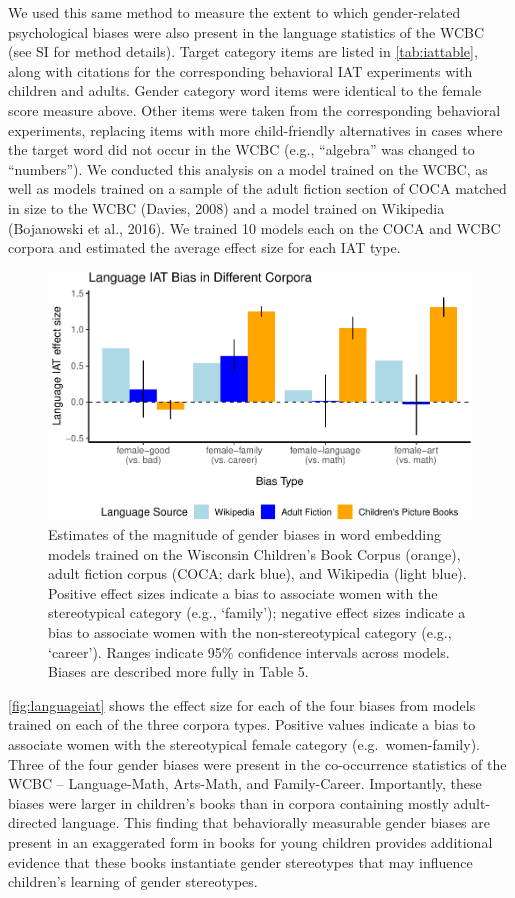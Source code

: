 \documentclass[
  english,
  ,man,floatsintext]{apa6}
\begin{document}
We used this same method to measure the extent to which gender-related psychological biases were also present in the language statistics of the WCBC (see SI for method details). Target category items are listed in \autoref{tab:iattable}, along with citations for the corresponding behavioral IAT experiments with children and adults. Gender category word items were identical to the female score measure above. Other items were taken from the corresponding behavioral experiments, replacing items with more child-friendly alternatives in cases where the target word did not occur in the WCBC (e.g., \enquote{algebra} was changed to \enquote{numbers}). We conducted this analysis on a model trained on the WCBC, as well as models trained on a sample of the adult fiction section of COCA matched in size to the WCBC (Davies, 2008) and a model trained on Wikipedia (Bojanowski et al., 2016). We trained 10 models each on the COCA and WCBC corpora and estimated the average effect size for each IAT type.

\begin{figure}[t!]
\includegraphics[width=\textwidth,]{kidbookgender_psych_sci_files/figure-latex/languageiat-1} \caption{Estimates of the magnitude of gender biases in word embedding models trained on the Wisconsin Children’s Book Corpus (orange), adult fiction corpus (COCA; dark blue), and Wikipedia (light blue). Positive effect sizes indicate a bias to associate women with the stereotypical category (e.g., ‘family'); negative effect sizes indicate a bias to associate women with the non-stereotypical category (e.g., ‘career’).  Ranges indicate 95\% confidence intervals across models. Biases are described more fully in Table 5.}\label{fig:languageiat}
\end{figure}

\autoref{fig:languageiat} shows the effect size for each of the four biases from models trained on each of the three corpora types. Positive values indicate a bias to associate women with the stereotypical female category (e.g.~women-family). Three of the four gender biases were present in the co-occurrence statistics of the WCBC -- Language-Math, Arts-Math, and Family-Career. Importantly, these biases were larger in children's books than in corpora containing mostly adult-directed language. This finding that behaviorally measurable gender biases are present in an exaggerated form in books for young children provides additional evidence that these books instantiate gender stereotypes that may influence children's learning of gender stereotypes.
\end{document}
